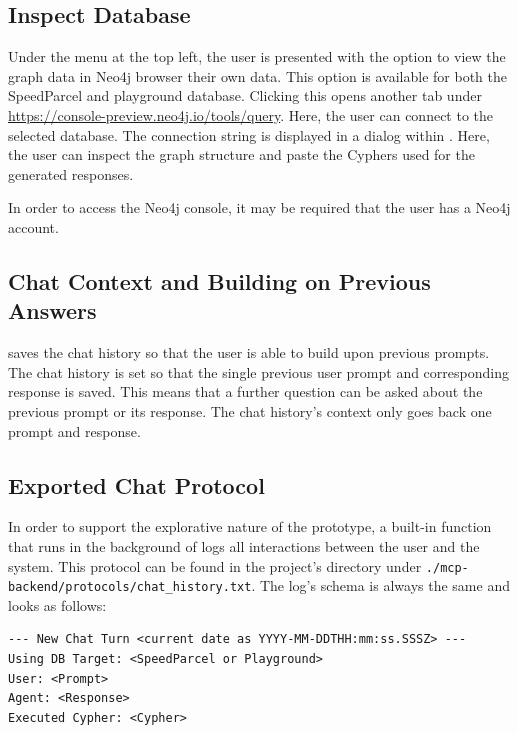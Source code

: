 \subsection{Inspect Database}
\label{appendix:instructions:inspect_database}
Under the menu at the top left, the user is presented with the option to view the graph data in Neo4j browser their own data. This option is available for both the SpeedParcel and playground database. Clicking this opens another tab under \href{https://console-preview.neo4j.io/tools/query}{https://console-preview.neo4j.io/tools/query}. Here, the user can connect to the selected database. The connection string is displayed in a dialog within \prototype. Here, the user can inspect the graph structure and paste the Cyphers used for the generated responses.

In order to access the Neo4j console, it may be required that the user has a Neo4j account.

\subsection{Chat Context and Building on Previous Answers}
\label{appendix:instructions:context}
\prototype{} saves the chat history so that the user is able to build upon previous prompts. The chat history is set so that the single previous user prompt and corresponding response is saved. This means that a further question can be asked about the previous prompt or its response. The chat history's context only goes back one prompt and response.

\subsection{Exported Chat Protocol}
\label{appendix:instructions:protocol}
In order to support the explorative nature of the prototype, a built-in function that runs in the background of \prototype{} logs all interactions between the user and the system. This protocol can be found in the project's directory under \texttt{./mcp-backend/protocols/chat\_history.txt}. The log's schema is always the same and looks as follows:

\begin{lstlisting}[style=cypherstyle, label={lst:protocol},caption={Schema of the automatically exported protocol}]
--- New Chat Turn <current date as YYYY-MM-DDTHH:mm:ss.SSSZ> ---
Using DB Target: <SpeedParcel or Playground>
User: <Prompt>
Agent: <Response>
Executed Cypher: <Cypher>
\end{lstlisting}

